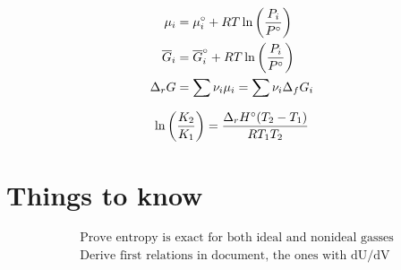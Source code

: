 \documentclass[10pt]{article} %
\begin{document}
\begin{align*}
  \mu_i &= \mu_i\degree + RT\ln\left(\frac{P_i}{P\degree}\right)\\
  \overline{G}_i &= \overline{G}_i\degree + RT\ln\left(\frac{P_i}{P\degree}\right)\\
  \Delta_r G &= \sum \nu_i\mu_i = \sum \nu_i \Delta_f G_i\\
\end{align*}

\begin{align*}
  \ln\left(\frac{K_2}{K_1}\right) &= \frac{\Delta_r H\degree(T_2-T_1)}{RT_1T_2}\\
\end{align*}

\section{Things to know}
\begin{align*}
  &\mbox{Prove entropy is exact for both ideal and nonideal gasses}\\
  &\mbox{Derive first relations in document, the ones with dU/dV}\\
\end{align*}
\end{document}
